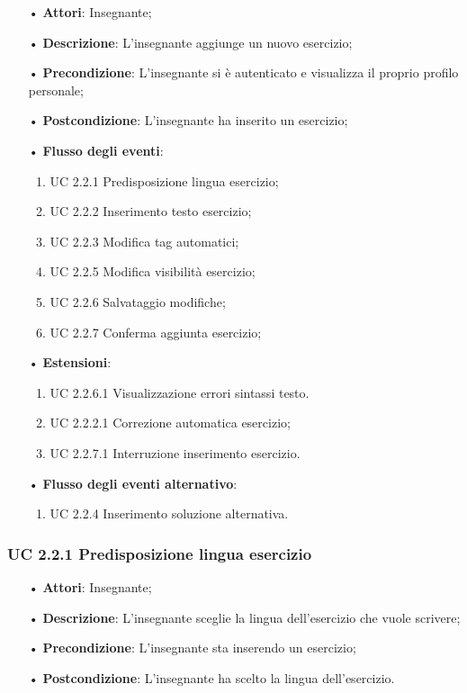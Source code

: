 \begin{itemize}
	\item[•] \textbf{Attori}: Insegnante;
	\item[•] \textbf{Descrizione}: L'insegnante aggiunge un nuovo esercizio;
	\item[•] \textbf{Precondizione}: L'insegnante si è autenticato e visualizza il proprio profilo personale;
	\item[•] \textbf{Postcondizione}: L'insegnante ha inserito un esercizio;
	\item[•] \textbf{Flusso degli eventi}:
	\begin{enumerate}
		\item UC 2.2.1 Predisposizione lingua esercizio;
		\item UC 2.2.2 Inserimento testo esercizio;
		\item UC 2.2.3 Modifica tag automatici;

		\item UC 2.2.5 Modifica visibilità esercizio;
		\item UC 2.2.6 Salvataggio modifiche;
		\item UC 2.2.7 Conferma aggiunta esercizio;
	\end{enumerate}
	\item[•] \textbf{Estensioni}:	
	\begin{enumerate}
		\item UC 2.2.6.1 Visualizzazione errori sintassi testo.
		\item UC 2.2.2.1 Correzione automatica esercizio;
		\item UC 2.2.7.1 Interruzione inserimento esercizio.
	\end{enumerate}
	\item[•] \textbf{Flusso degli eventi alternativo}:
	\begin{enumerate}
		\item UC 2.2.4 Inserimento soluzione alternativa.
	\end{enumerate}
\end{itemize}
\subsubsection{UC 2.2.1 Predisposizione lingua esercizio}
\begin{itemize}
	\item[•] \textbf{Attori}: Insegnante;
	\item[•] \textbf{Descrizione}: L'insegnante sceglie la lingua dell’esercizio che vuole scrivere;
	\item[•] \textbf{Precondizione}: L'insegnante sta inserendo un esercizio;
	\item[•] \textbf{Postcondizione}: L'insegnante ha scelto la lingua dell'esercizio.
\end{itemize}

